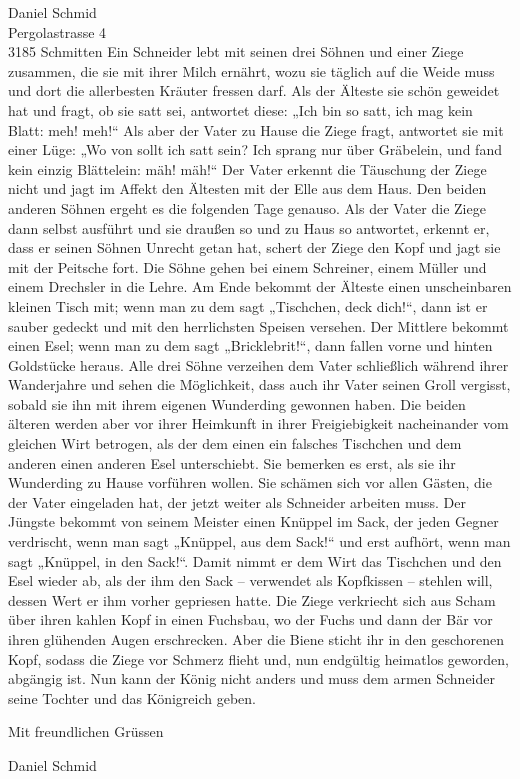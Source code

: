 \documentclass[10pt]{letter}
\begin{document}
\begin{letter}{Daniel Schmid\\ Pergolastrasse 4 \\ 3185 Schmitten}
Ein Schneider lebt mit seinen drei Söhnen und einer Ziege zusammen, die sie mit ihrer Milch ernährt, wozu sie täglich auf die Weide muss und dort die allerbesten Kräuter fressen darf. Als der Älteste sie schön geweidet hat und fragt, ob sie satt sei, antwortet diese: „Ich bin so satt, ich mag kein Blatt: meh! meh!“ Als aber der Vater zu Hause die Ziege fragt, antwortet sie mit einer Lüge: „Wo von sollt ich satt sein? Ich sprang nur über Gräbelein, und fand kein einzig Blättelein: mäh! mäh!“ Der Vater erkennt die Täuschung der Ziege nicht und jagt im Affekt den Ältesten mit der Elle aus dem Haus. Den beiden anderen Söhnen ergeht es die folgenden Tage genauso. Als der Vater die Ziege dann selbst ausführt und sie draußen so und zu Haus so antwortet, erkennt er, dass er seinen Söhnen Unrecht getan hat, schert der Ziege den Kopf und jagt sie mit der Peitsche fort. Die Söhne gehen bei einem Schreiner, einem Müller und einem Drechsler in die Lehre. Am Ende bekommt der Älteste einen unscheinbaren kleinen Tisch mit; wenn man zu dem sagt „Tischchen, deck dich!“, dann ist er sauber gedeckt und mit den herrlichsten Speisen versehen. Der Mittlere bekommt einen Esel; wenn man zu dem sagt „Bricklebrit!“, dann fallen vorne und hinten Goldstücke heraus. Alle drei Söhne verzeihen dem Vater schließlich während ihrer Wanderjahre und sehen die Möglichkeit, dass auch ihr Vater seinen Groll vergisst, sobald sie ihn mit ihrem eigenen Wunderding gewonnen haben. Die beiden älteren werden aber vor ihrer Heimkunft in ihrer Freigiebigkeit nacheinander vom gleichen Wirt betrogen, als der dem einen ein falsches Tischchen und dem anderen einen anderen Esel unterschiebt. Sie bemerken es erst, als sie ihr Wunderding zu Hause vorführen wollen. Sie schämen sich vor allen Gästen, die der Vater eingeladen hat, der jetzt weiter als Schneider arbeiten muss. Der Jüngste bekommt von seinem Meister einen Knüppel im Sack, der jeden Gegner verdrischt, wenn man sagt „Knüppel, aus dem Sack!“ und erst aufhört, wenn man sagt „Knüppel, in den Sack!“. Damit nimmt er dem Wirt das Tischchen und den Esel wieder ab, als der ihm den Sack – verwendet als Kopfkissen – stehlen will, dessen Wert er ihm vorher gepriesen hatte. Die Ziege verkriecht sich aus Scham über ihren kahlen Kopf in einen Fuchsbau, wo der Fuchs und dann der Bär vor ihren glühenden Augen erschrecken. Aber die Biene sticht ihr in den geschorenen Kopf, sodass die Ziege vor Schmerz flieht und, nun endgültig heimatlos geworden, abgängig ist.
Nun kann der König nicht anders und muss dem armen Schneider seine Tochter und das Königreich geben.
\vspace{20mm}
\closing{Mit freundlichen Grüssen}
Daniel Schmid
\end{letter}
\end{document}
